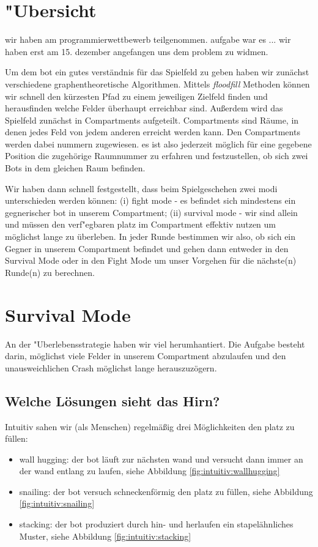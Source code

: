 


\section{"Ubersicht}
wir haben am programmierwettbewerb teilgenommen.
aufgabe war es ...
wir haben erst am 15. dezember angefangen uns dem problem zu widmen.


Um dem bot ein gutes verständnis für das Spielfeld zu geben haben wir zunächst verschiedene graphentheoretische Algorithmen.
Mittels \textit{floodfill} Methoden können wir schnell den kürzesten Pfad zu einem jeweiligen Zielfeld finden und herausfinden welche Felder überhaupt erreichbar sind.
Außerdem wird das Spielfeld zunächst in Compartments aufgeteilt.
Compartments sind Räume, in denen jedes Feld von jedem anderen erreicht werden kann.
Den Compartments werden dabei nummern zugewiesen.
es ist also jederzeit möglich für eine gegebene Position die zugehörige Raumnummer zu erfahren und festzustellen, ob sich zwei Bots in dem gleichen Raum befinden.

Wir haben dann schnell festgestellt, dass beim Spielgeschehen zwei modi unterschieden werden können:
(i) fight mode - es befindet sich mindestens ein gegnerischer bot in unserem Compartment;
(ii) survival mode - wir sind allein und müssen den verf"egbaren platz im Compartment effektiv nutzen um möglichst lange zu überleben.
In jeder Runde bestimmen wir also, ob sich ein Gegner in unserem Compartment befindet und gehen dann entweder in den Survival Mode oder in den Fight Mode um unser Vorgehen für die nächste(n) Runde(n) zu berechnen.

\section{Survival Mode}
An der "Uberlebensstrategie haben wir viel herumhantiert.
Die Aufgabe besteht darin, möglichst viele Felder in unserem Compartment abzulaufen und den unausweichlichen Crash möglichst lange herauszuzögern.

\subsection{Welche Lösungen sieht das Hirn?}
Intuitiv sahen wir (als Menschen) regelmäßig drei Möglichkeiten den platz zu füllen:
\begin{itemize}
 \item wall hugging: der bot läuft zur nächsten wand und versucht dann immer an der wand entlang zu laufen, siehe Abbildung \ref{fig:intuitiv:wallhugging}
 \item snailing: der bot versuch schneckenförmig den platz zu füllen, siehe Abbildung \ref{fig:intuitiv:snailing}
 \item stacking: der bot produziert durch hin- und herlaufen ein stapelähnliches Muster, siehe Abbildung \ref{fig:intuitiv:stacking}
\end{itemize}


